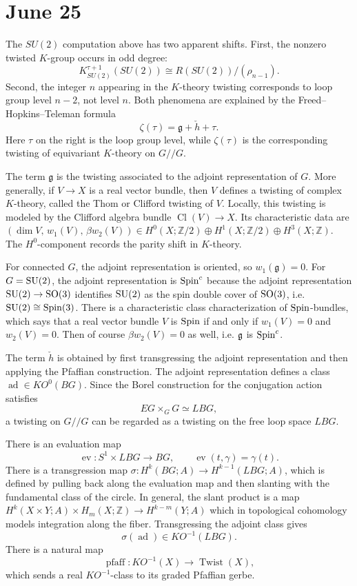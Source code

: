\documentclass[12pt]{article}
\begin{document}
\section{June 25}
The $SU(2)$ computation above has two apparent shifts. First, the nonzero twisted $K$-group occurs in odd degree:
\[
    K^{\tau+1}_{SU(2)}(SU(2))
    \cong
    R(SU(2))/(\rho_{n-1}).
\]
Second, the integer $n$ appearing in the $K$-theory twisting corresponds to loop group level $n-2$, not level $n$. Both phenomena are explained by the Freed--Hopkins--Teleman formula
\[
    \zeta(\tau)=\mathfrak g+\check h+\tau.
\]
Here $\tau$ on the right is the loop group level, while $\zeta(\tau)$ is the corresponding twisting of equivariant $K$-theory on $G//G$.

The term $\mathfrak g$ is the twisting associated to the adjoint representation of $G$. More generally, if $V\to X$ is a real vector bundle, then $V$ defines a twisting of complex $K$-theory, called the Thom or Clifford twisting of $V$. Locally, this twisting is modeled by the Clifford algebra bundle $\operatorname{Cl}(V)\longrightarrow X$.
Its characteristic data are $(\dim V,\, w_1(V),\, \beta w_2(V)) \in H^0(X;\mathbb Z/2)\oplus H^1(X;\mathbb Z/2)\oplus H^3(X;\mathbb Z)$.
The $H^0$-component records the parity shift in $K$-theory.

For connected $G$, the adjoint representation is oriented, so $w_1(\mathfrak g)=0$.
For $G=\operatorname{SU}(2)$, the adjoint representation is $\operatorname{Spin}^c$ because the adjoint representation $\operatorname{SU}(2) \to \operatorname{SO}(3)$ identifies $\operatorname{SU}(2)$ as the spin double cover of $\operatorname{SO}(3)$, i.e. $\operatorname{SU}(2)\cong \operatorname{Spin}(3)$. There is a characteristic class characterization of $\operatorname{Spin}$-bundles, which says that a real vector bundle $V$ is $\operatorname{Spin}$ if and only if $w_1(V)=0$ and $w_2(V)=0$. Then of course $\beta w_2(V)=0$ as well, i.e. $\mathfrak{g}$ is $\operatorname{Spin}^c$.

The term $\check h$ is obtained by first transgressing the adjoint representation and then applying the Pfaffian construction. The adjoint representation defines a class
$\operatorname{ad}\in KO^0(BG)$.
Since the Borel construction for the conjugation action satisfies
\[
    EG\times_G G\simeq LBG,
\]
a twisting on $G//G$ can be regarded as a twisting on the free loop space $LBG$.

There is an evaluation map
\[
    \operatorname{ev}:S^1\times LBG\longrightarrow BG,
    \qquad
    \operatorname{ev}(t,\gamma)=\gamma(t).
\]
There is a transgression map $\sigma:H^k(BG;A)\longrightarrow H^{k-1}(LBG;A)$, which is defined by pulling back along the evaluation map and then slanting with the fundamental class of the circle. In general, the slant product is a map $H^k(X\times Y;A)\times H_m(X;\mathbb Z)
    \longrightarrow
    H^{k-m}(Y;A)$ which in topological cohomology models integration along the fiber. Transgressing the adjoint class gives
\[
    \sigma(\operatorname{ad})
    \in
    KO^{-1}(LBG).
\]
There is a natural map
\[
    \operatorname{pfaff}:KO^{-1}(X)\longrightarrow \operatorname{Twist}(X),
\]
which sends a real $KO^{-1}$-class to its graded Pfaffian gerbe.
\end{document}
